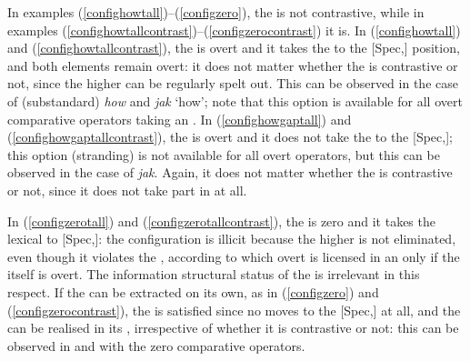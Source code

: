 In examples (\ref{confighowtall})--(\ref{configzero}), the  is not contrastive, while in examples (\ref{confighowtallcontrast})--(\ref{configzerocontrast}) it is. In (\ref{confighowtall}) and (\ref{confighowtallcontrast}), the  is overt and it takes the  to the [Spec,] position, and both elements remain overt: it does not matter whether the  is contrastive or not, since the higher  can be regularly spelt out. This can be observed in the case of  (substandard) \textit{how} and  \textit{jak} `how'; note that this option is available for all overt comparative operators taking an . In (\ref{confighowgaptall}) and (\ref{confighowgaptallcontrast}), the  is overt and it does not take the  to the [Spec,]; this option (stranding) is not available for all overt operators, but this can be observed in the case of  \textit{jak}. Again, it does not matter whether the  is contrastive or not, since it does not take part in  at all.

In (\ref{configzerotall}) and (\ref{configzerotallcontrast}), the  is zero and it takes the lexical  to [Spec,]: the configuration is illicit because the higher  is not eliminated, even though it violates the , according to which overt  is licensed in an  only if the  itself is overt. The information structural status of the  is irrelevant in this respect. If the  can be extracted on its own, as in (\ref{configzero}) and (\ref{configzerocontrast}), the  is satisfied since no  moves to the [Spec,] at all, and the  can be realised in its , irrespective of whether it is contrastive or not: this can be observed in  and  with the zero comparative operators.

